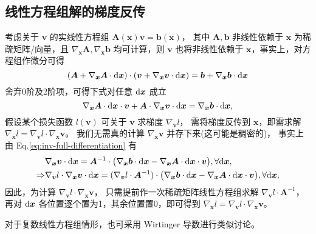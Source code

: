 \subsection{线性方程组解的梯度反传}\label{appendix:inv-linear-equation-grad}
考虑关于 $\bm{v}$ 的实线性方程组 $\bm{A}(\bm{x})\bm{v}=\bm{b}(\bm{x})$，
其中 $\bm{A},\bm{b}$ 非线性依赖于 $\bm{x}$ 为稀疏矩阵/向量，且
$\nabla_{\bm{x}}\bm{A},\nabla_{\bm{x}}\bm{b}$
均可计算，则 $\bm{v}$ 也将非线性依赖于 $\bm{x}$，事实上，对方程组作微分可得
\[
  (\bm{A}+\nabla_{\bm{x}}\bm{A}\cdot\mathrm{d}\bm{x})\cdot
  (\bm{v}+\nabla_{\bm{x}}\bm{v}\cdot\mathrm{d}\bm{x})
  =\bm{b}+\nabla_{\bm{x}}\bm{b}\cdot\mathrm{d}\bm{x}
\]
舍弃0阶及2阶项，可得下式对任意 $\mathrm{d}\bm{x}$ 成立
\begin{equation}\label{eq:inv-full-differentiation}
  \nabla_{\bm{x}}\bm{A}\cdot\mathrm{d}\bm{x}\cdot\bm{v}
  +\bm{A}\cdot\nabla_{\bm{x}}\bm{v}\cdot\mathrm{d}\bm{x}
  =\nabla_{\bm{x}}\bm{b}\cdot\mathrm{d}\bm{x},
\end{equation}
假设某个损失函数 $l(\bm{v})$ 可关于 $\bm{v}$ 求梯度 $\nabla_{\bm{v}}l$，
需将梯度反传到 $\bm{x}$，即需求解
$\nabla_{\bm{x}}l=\nabla_{\bm{v}}l\cdot\nabla_{\bm{x}}\bm{v}$。
我们无需真的计算 $\nabla_{\bm{x}}\bm{v}$ 并存下来(这可能是稠密的)，
事实上由 Eq.\ref{eq:inv-full-differentiation} 有
\[
  \begin{split}
  & \nabla_{\bm{x}}\bm{v}\cdot\mathrm{d}\bm{x}
  = \bm{A}^{-1}\cdot\big(\nabla_{\bm{x}}\bm{b}\cdot\mathrm{d}\bm{x}-
  \nabla_{\bm{x}}\bm{A}\cdot\mathrm{d}\bm{x}\cdot\bm{v}\big),\forall \mathrm{d}\bm{x}, \\
  \Rightarrow
    & \nabla_{\bm{v}}l\cdot\nabla_{\bm{x}}\bm{v}\cdot\mathrm{d}\bm{x}
    = (\nabla_{\bm{v}}l\cdot\bm{A}^{-1})\cdot\big(\nabla_{\bm{x}}\bm{b}\cdot\mathrm{d}\bm{x}-
  \nabla_{\bm{x}}\bm{A}\cdot\mathrm{d}\bm{x}\cdot\bm{v}\big),\forall \mathrm{d}\bm{x}, \\
  \end{split}
\]
因此，为计算 $\nabla_{\bm{v}}l\cdot\nabla_{\bm{x}}\bm{v}$，
只需提前作一次稀疏矩阵线性方程组求解 $\nabla_{\bm{v}}l\cdot\bm{A}^{-1}$，
再对 $\mathrm{d}\bm{x}$ 各位置逐个置为1，其余位置置0，即可得到
$\nabla_{\bm{x}}l=\nabla_{\bm{v}}l\cdot\nabla_{\bm{x}}\bm{v}$。

对于复数线性方程组情形，也可采用 Wirtinger 导数进行类似讨论。

